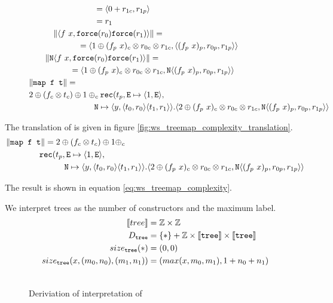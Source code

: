 \begin{figure}
\begin{equation*}
\begin{split}
      &\qquad\quad\quad\quad\quad\quad\quad = \langle 0 + r_{1c}, r_{1p} \rangle \\
      &\qquad\quad\quad\quad\quad\quad\quad = r_1  \\
      &\qquad\quad \|\langle f\ x, \texttt{force}(r_0) \texttt{force}(r_1)\rangle \| = \\
      &\qquad\quad\quad\quad\quad = \langle 1 \oplus (f_p\ x)_c \otimes r_{0c} \otimes r_{1c}, \langle (f_p\ x)_p, r_{0p}, r_{1p}\rangle\rangle \\
      &\qquad \|\texttt{N}\langle f\ x, \texttt{force}(r_0) \texttt{force}(r_1)\rangle \| = \\
      &\qquad\quad\quad\quad = \langle 1 \oplus (f_p\ x)_c \otimes r_{0c} \otimes r_{1c}, \texttt{N} \langle (f_p\ x)_p, r_{0p}, r_{1p}\rangle\rangle \\
      &\|\texttt{map f t}\| = \\
      &2 \oplus (f_c \otimes t_c) \oplus 1 \oplus_c \texttt{rec}(t_p, \texttt{E} \mapsto \langle 1, \texttt{E}\rangle, \\
      &\qquad\quad\quad\quad\quad\quad\quad \texttt{N} \mapsto \langle y, \langle t_0, r_0 \rangle \langle t_1, r_1 \rangle \rangle.  \langle 2 \oplus (f_p\ x)_c \otimes r_{0c} \otimes r_{1c}, \texttt{N} \langle (f_p\ x)_p, r_{0p}, r_{1p}\rangle\rangle
    \end{split}
  \end{equation*}
\end{figure}

The translation of  is given in figure \ref{fig:ws_treemap_complexity_translation}.
\begin{equation}
  \label{eq:ws_treemap_complexity}
  \begin{split}
    &\|\texttt{map f t}\| = 2 \oplus (f_c \otimes t_c) \oplus 1 \oplus_c \\
    &\qquad\quad\quad \texttt{rec}(t_p, \texttt{E} \mapsto \langle 1, \texttt{E}\rangle, \\
    &\qquad\quad\quad\quad\quad\quad \texttt{N} \mapsto \langle y, \langle t_0, r_0 \rangle \langle t_1, r_1 \rangle \rangle.  \langle 2 \oplus (f_p\ x)_c \otimes r_{0c} \otimes r_{1c}, \texttt{N} \langle (f_p\ x)_p, r_{0p}, r_{1p}\rangle\rangle
\end{split}
\end{equation}

The result is shown in equation \ref{eq:ws_treemap_complexity}.

We interpret trees as the number of  constructors and the maximum label.
\begin{align*}
  \llbracket tree \rrbracket &= \mathbb{Z} \times \mathbb{Z} \\
  D_{\texttt{tree}} &= \{\ast\} + \mathbb{Z} \times \llbracket \texttt{tree} \rrbracket \times \llbracket \texttt{tree} \rrbracket \\
  size_{\texttt{tree}}(\ast) &= (0, 0) \\
  size_{\texttt{tree}}(x, (m_0, n_0), (m_1, n_1)) &= (max(x, m_0, m_1), 1 + n_0 + n_1)
\end{align*}

\begin{figure}
  \label{fig:ws_map_interpretation_derivation}
  \caption{Deriviation of interpretation of }
\[ \begin{split}
\end{split} \]
\end{figure}
